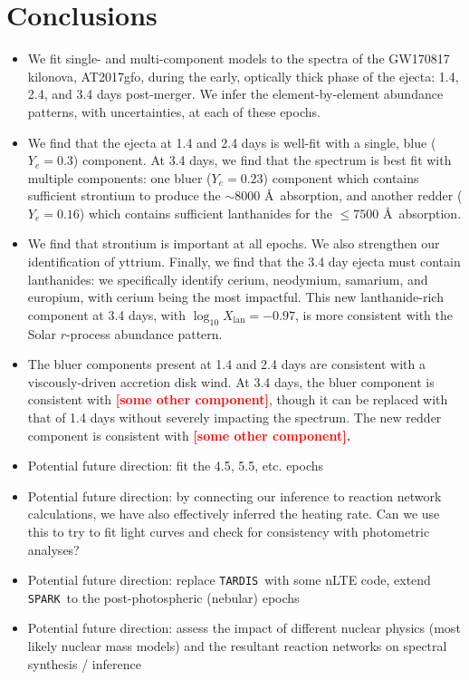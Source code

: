 \documentclass[twocolumn,twocolappendix]{aastex63}
\def\SPARK{\texttt{SPARK}}
\def\TARDIS{\texttt{TARDIS}}
\newcommand\redbf[1]{\textbf{\textcolor{red}{#1}}}
\begin{document}
\section{Conclusions}\label{sec:conco}
\begin{itemize}
    
    \item We fit single- and multi-component models to the spectra of the GW170817 kilonova, AT2017gfo, during the early, optically thick phase of the ejecta: 1.4, 2.4, and 3.4 days post-merger. We infer the element-by-element abundance patterns, with uncertainties, at each of these epochs. 

    \item We find that the ejecta at 1.4 and 2.4 days is well-fit with a single, blue ($Y_e = 0.3$) component. At 3.4 days, we find that the spectrum is best fit with multiple components: one bluer ($Y_e = 0.23$) component which contains sufficient strontium to produce the $\sim 8000$ \AA~absorption, and another redder ($Y_e = 0.16$) which contains sufficient lanthanides for the $\leqslant 7500$ \AA~absorption. 

    \item We find that strontium is important at all epochs. We also strengthen our identification of yttrium. Finally, we find that the 3.4 day ejecta must contain lanthanides: we specifically identify cerium, neodymium, samarium, and europium, with cerium being the most impactful. This new lanthanide-rich component at 3.4 days, with $\log_{10} X_{\mathrm{lan}} = -0.97$, is more consistent with the Solar $r$-process abundance pattern.

    \item The bluer components present at 1.4 and 2.4 days are consistent with a viscously-driven accretion disk wind. At 3.4 days, the bluer component is consistent with \redbf{[some other component]}, though it can be replaced with that of 1.4 days without severely impacting the spectrum. The new redder component is consistent with \redbf{[some other component].}

    \item Potential future direction: fit the 4.5, 5.5, etc. epochs

    \item Potential future direction: by connecting our inference to reaction network calculations, we have also effectively inferred the heating rate. Can we use this to try to fit light curves and check for consistency with photometric analyses?

    \item Potential future direction: replace \TARDIS~with some nLTE code, extend \SPARK~to the post-photospheric (nebular) epochs

    \item Potential future direction: assess the impact of different nuclear physics (most likely nuclear mass models) and the resultant reaction networks on spectral synthesis / inference

\end{itemize}
\end{document}
